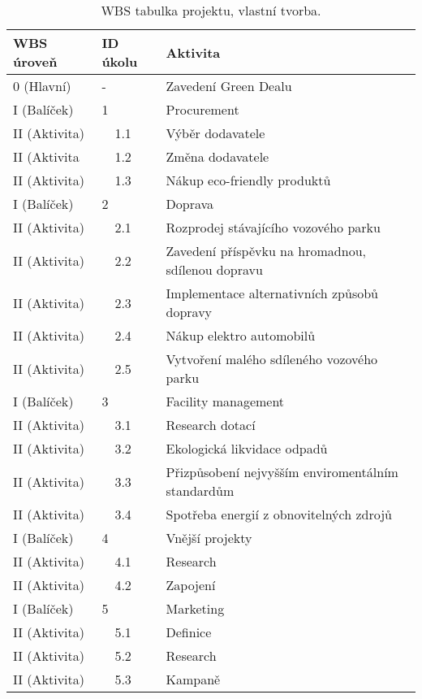 \begin{table}[!hbtp]
\centering
\begin{tabular}{|l|l|l|}
\hline
WBS úroveň & ID úkolu & Aktivita \\ \hline
0 (Hlavní) & - & Zavedení Green Dealu \\ \hline
\rowcolor[HTML]{C0C0C0} 
I (Balíček) & 1 & Procurement \\ \hline
II (Aktivita) & \ \ 1.1 & Výběr dodavatele \\ \hline
II (Aktivita & \ \ 1.2 & Změna dodavatele \\ \hline
II (Aktivita) & \ \ 1.3 & Nákup eco-friendly produktů \\ \hline
\rowcolor[HTML]{C0C0C0} 
I (Balíček) & 2 & Doprava \\ \hline
II (Aktivita) & \ \ 2.1 & Rozprodej stávajícího vozového parku \\ \hline
II (Aktivita) & \ \ 2.2 & Zavedení příspěvku na hromadnou, sdílenou dopravu \\ \hline
II (Aktivita) & \ \ 2.3 & Implementace alternativních způsobů dopravy \\ \hline
II (Aktivita) & \ \ 2.4 & Nákup elektro automobilů \\ \hline
II (Aktivita) & \ \ 2.5 & Vytvoření malého sdíleného vozového parku \\ \hline
\rowcolor[HTML]{C0C0C0} 
I (Balíček) & 3 & Facility management \\ \hline
II (Aktivita) & \ \ 3.1 & Research dotací \\ \hline
II (Aktivita) & \ \ 3.2 & Ekologická likvidace odpadů \\ \hline
II (Aktivita) & \ \ 3.3 & Přizpůsobení nejvyšším enviromentálním standardům \\ \hline
II (Aktivita) & \ \ 3.4 & Spotřeba energií z obnovitelných zdrojů \\ \hline
\rowcolor[HTML]{C0C0C0} 
I (Balíček) & 4 & Vnější projekty \\ \hline
II (Aktivita) & \ \ 4.1 & Research \\ \hline
II (Aktivita) & \ \ 4.2 & Zapojení \\ \hline
\rowcolor[HTML]{C0C0C0} 
I (Balíček) & 5 & Marketing \\ \hline
II (Aktivita) & \ \ 5.1 & Definice \\ \hline
II (Aktivita) & \ \ 5.2 & Research \\ \hline
II (Aktivita) & \ \ 5.3 & Kampaně \\ \hline
\end{tabular}
\caption[WBS tabulka projektu]{WBS tabulka projektu, vlastní tvorba.}
\label{tab:WBS tabulka projektu}
\end{table}

